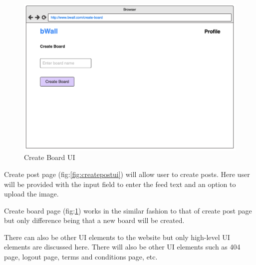 \documentclass[12pt]{report}
\begin{document}
\begin{figure}[H]
\centering
\includegraphics[width=12cm]{uicreateboard.png}
\caption{Create Board UI}
\label{fig:createboardui}
\end{figure}

Create post page (fig:\ref{fig:createpostui}) will allow user to create posts. Here user will be provided with the input field to enter the feed text and an option to upload the image.

Create board page (fig:\ref{fig:createboardui}) works in the similar fashion to that of create post page but only difference being that a new board will be created.

There can also be other UI elements to the website but only high-level UI elements are discussed here. There will also be other UI elements such as 404 page, logout page, terms and conditions page, etc.
\end{document}
